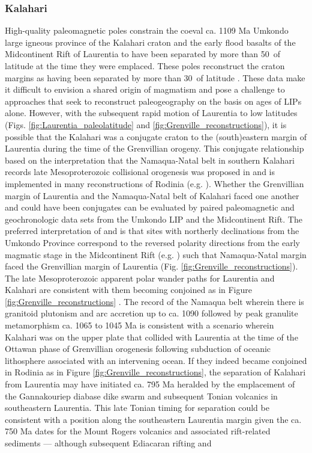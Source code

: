\documentclass[twocolumn, switch]{article} %
\begin{document}
\subsubsection{Kalahari}

High-quality paleomagnetic poles constrain the coeval ca. 1109 Ma Umkondo large igneous province of the Kalahari craton and the early flood basalts of the Midcontinent Rift of Laurentia to have been separated by more than 50\textdegree\ of latitude at the time they were emplaced. These poles reconstruct the craton margins as having been separated by more than 30\textdegree\ of latitude \citep{Swanson-Hysell2015a}. These data make it difficult to envision a shared origin of magmatism and pose a challenge to approaches that seek to reconstruct paleogeography on the basis on ages of LIPs alone. However, with the subsequent rapid motion of Laurentia to low latitudes (Figs. \ref{fig:Laurentia_paleolatitude} and \ref{fig:Grenville_reconstructions}), it is possible that the Kalahari was a conjugate craton to the (south)eastern margin of Laurentia during the time of the Grenvillian orogeny. This conjugate relationship based on the interpretation that the Namaqua-Natal belt in southern Kalahari records late Mesoproterozoic collisional orogenesis was  proposed in \cite{Hoffman1991a} and is implemented in many reconstructions of Rodinia (e.g. \citealp{Li2008a}). Whether the Grenvillian margin of Laurentia and the Namaqua-Natal belt of Kalahari faced one another and could have been conjugates can be evaluated by paired paleomagnetic and geochronologic data sets from the Umkondo LIP and the Midcontinent Rift. The preferred interpretation of \cite{Swanson-Hysell2015a} and \cite{Kasbohm2015a} is that sites with northerly declinations from the Umkondo Province correspond to the reversed polarity directions from the early magmatic stage in the Midcontinent Rift (e.g. \citealp{Swanson-Hysell2014a}) such that Namaqua-Natal margin faced the Grenvillian margin of Laurentia (Fig. \ref{fig:Grenville_reconstructions}). The late Mesoproterozoic apparent polar wander paths for Laurentia and Kalahari are consistent with them becoming conjoined as in Figure \ref{fig:Grenville_reconstructions} \citep{Swanson-Hysell2015a}. The record of the Namaqua belt wherein there is granitoid plutonism and arc accretion up to ca. 1090 followed by peak granulite metamorphism ca. 1065 to 1045 Ma \citep{Diener2013a, Spencer2015a} is consistent with a scenario wherein Kalahari was on the upper plate that collided with Laurentia at the time of the Ottawan phase of Grenvillian orogenesis following subduction of oceanic lithosphere associated with an intervening ocean. If they indeed became conjoined in Rodinia as in Figure \ref{fig:Grenville_reconstructions}, the separation of Kalahari from Laurentia may have initiated ca. 795 Ma heralded by the emplacement of the Gannakouriep diabase dike swarm \citep{Rioux2010a, DeKock2021a} and subsequent Tonian volcanics in southeastern Laurentia. This late Tonian timing for separation could be  consistent with a position along the southeastern Laurentia margin given the ca. 750 Ma dates for the Mount Rogers volcanics and associated rift-related sediments \citep{Aleinikoff1995a,MacLennan2020a} --- although subsequent Ediacaran rifting and 
\end{document}

